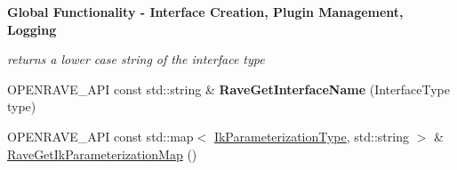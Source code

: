 \begin{Indent}{\bf Global Functionality -\/ Interface Creation, Plugin Management, Logging}
\begin{DoxyCompactItemize}
\begin{DoxyCompactList}\small\item\em returns a lower case string of the interface type \item\end{DoxyCompactList}\item 
\hypertarget{namespaceOpenRAVE_a2cf22ffbd99a4036dd928b8967b32d65}{
OPENRAVE\_\-API const std::string \& {\bfseries RaveGetInterfaceName} (InterfaceType type)}
\label{namespaceOpenRAVE_a2cf22ffbd99a4036dd928b8967b32d65}

\item 
\hypertarget{namespaceOpenRAVE_a57e2c8eb692383282f51474c92a984c5}{
OPENRAVE\_\-API const std::map$<$ \hyperlink{namespaceOpenRAVE_a16f7833e516a35d385ac594a44e44a2e}{IkParameterizationType}, std::string $>$ \& \hyperlink{namespaceOpenRAVE_a57e2c8eb692383282f51474c92a984c5}{RaveGetIkParameterizationMap} ()}
\label{namespaceOpenRAVE_a57e2c8eb692383282f51474c92a984c5}


\end{DoxyCompactItemize}
\end{Indent}
